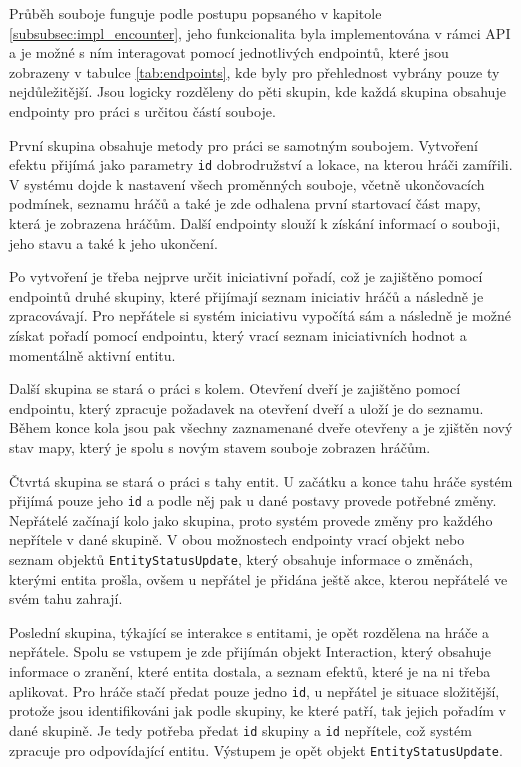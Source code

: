 

Průběh souboje funguje podle postupu popsaného v kapitole \ref{subsubsec:impl_encounter}, jeho funkcionalita byla implementována v rámci API a je možné s ním interagovat pomocí jednotlivých endpointů, které jsou zobrazeny v tabulce \ref{tab:endpoints}, kde byly pro přehlednost vybrány pouze ty nejdůležitější. Jsou logicky rozděleny do pěti skupin, kde každá skupina obsahuje endpointy pro práci s určitou částí souboje.

První skupina obsahuje metody pro práci se samotným soubojem. Vytvoření efektu přijímá jako parametry \texttt{id} dobrodružství a lokace, na kterou hráči zamířili. V systému dojde k nastavení všech proměnných souboje, včetně ukončovacích podmínek, seznamu hráčů a také je zde odhalena první startovací část mapy, která je zobrazena hráčům. Další endpointy slouží k získání informací o souboji, jeho stavu a také k jeho ukončení.

Po vytvoření je třeba nejprve určit iniciativní pořadí, což je zajištěno pomocí endpointů druhé skupiny, které přijímají seznam iniciativ hráčů a následně je zpracovávají. Pro nepřátele si systém iniciativu vypočítá sám a následně je možné získat pořadí pomocí endpointu, který vrací seznam iniciativních hodnot a momentálně aktivní entitu.

Další skupina se stará o práci s kolem. Otevření dveří je zajištěno pomocí endpointu, který zpracuje požadavek na otevření dveří a uloží je do seznamu. Během konce kola jsou pak všechny zaznamenané dveře otevřeny a je zjištěn nový stav mapy, který je spolu s novým stavem souboje zobrazen hráčům.

Čtvrtá skupina se stará o práci s tahy entit. U začátku a konce tahu hráče systém přijímá pouze jeho \texttt{id} a podle něj pak u dané postavy provede potřebné změny. Nepřátelé začínají kolo jako skupina, proto systém provede změny pro každého nepřítele v dané skupině. V obou možnostech endpointy vrací objekt nebo seznam objektů \texttt{EntityStatusUpdate}, který obsahuje informace o změnách, kterými entita prošla, ovšem u nepřátel je přidána ještě akce, kterou nepřátelé ve svém tahu zahrají.

Poslední skupina, týkající se interakce s entitami, je opět rozdělena na hráče a nepřátele. Spolu se vstupem je zde přijímán objekt Interaction, který obsahuje informace o zranění, které entita dostala, a seznam efektů, které je na ni třeba aplikovat. Pro hráče stačí předat pouze jedno \texttt{id}, u nepřátel je situace složitější, protože jsou identifikováni jak podle skupiny, ke které patří, tak jejich pořadím v dané skupině. Je tedy potřeba předat \texttt{id} skupiny a \texttt{id} nepřítele, což systém zpracuje pro odpovídající entitu. Výstupem je opět objekt \texttt{EntityStatusUpdate}.

